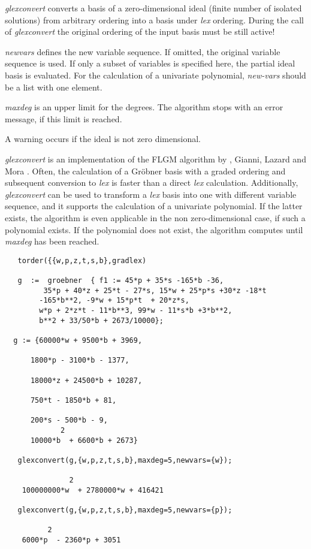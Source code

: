 \emph{glexconvert} converts a basis of a zero-dimensional ideal (finite number
of isolated solutions) from arbitrary ordering into a basis under {\it
lex} ordering. During the call of \emph{glexconvert} the original ordering of
the input basis must be still active!

\emph{newvars} defines the new variable sequence. If omitted, the
original variable sequence is used. If only a subset of variables is
specified here, the partial ideal basis is evaluated. For the
calculation of a univariate polynomial, \emph{new-vars} should be a list
with one element.

\emph{maxdeg} is an upper limit for the degrees. The algorithm stops with
an error message, if this limit is reached.

A warning occurs if the ideal is not zero dimensional.

\emph{glexconvert} is an implementation of the FLGM algorithm by
, {\sc Gianni}, {\sc Lazard} and {\sc
Mora} \cite{Faugere:93}. Often, the calculation of a Gr\"obner basis
with a graded ordering and subsequent conversion to {\it lex} is
faster than a direct {\it lex} calculation. Additionally, \emph{glexconvert}
can be used to transform a {\it lex} basis into one with different
variable sequence, and it supports the calculation of a univariate
polynomial. If the latter exists, the algorithm is even applicable in
the non zero-dimensional case, if such a polynomial exists.
If the polynomial does not exist, the algorithm computes  until \emph{maxdeg}
has been reached.
\begin{verbatim}
   torder({{w,p,z,t,s,b},gradlex)

   g  :=  groebner  { f1 := 45*p + 35*s -165*b -36,
         35*p + 40*z + 25*t - 27*s, 15*w + 25*p*s +30*z -18*t
        -165*b**2, -9*w + 15*p*t  + 20*z*s,
        w*p + 2*z*t - 11*b**3, 99*w - 11*s*b +3*b**2,
        b**2 + 33/50*b + 2673/10000};

  g := {60000*w + 9500*b + 3969,

      1800*p - 3100*b - 1377,

      18000*z + 24500*b + 10287,

      750*t - 1850*b + 81,

      200*s - 500*b - 9,
             2
      10000*b  + 6600*b + 2673}

   glexconvert(g,{w,p,z,t,s,b},maxdeg=5,newvars={w});

               2
    100000000*w  + 2780000*w + 416421

   glexconvert(g,{w,p,z,t,s,b},maxdeg=5,newvars={p});

          2
    6000*p  - 2360*p + 3051
\end{verbatim}

